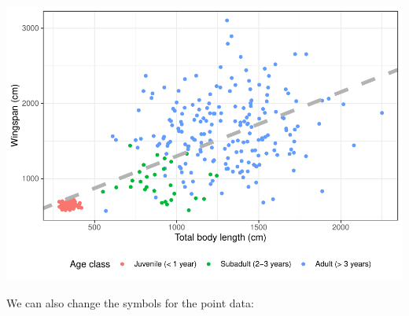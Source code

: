 \documentclass[
]{book}
\begin{document}
\includegraphics{reproducible-science_files/figure-latex/gg18-1.pdf}

We can also change the symbols for the point data:
\end{document}
